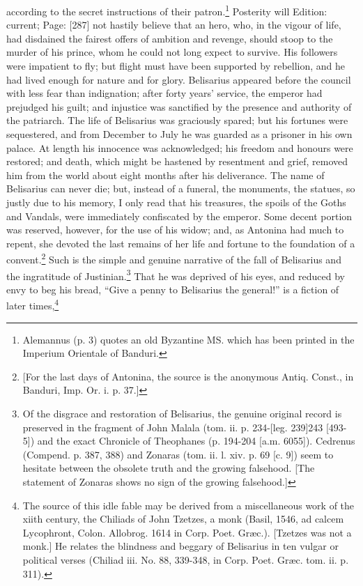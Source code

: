 according to the secret instructions of their patron.\footnote{Alemannus (p. 3) quotes an old Byzantine MS. which has been printed in the Imperium Orientale of Banduri.} Posterity will Edition: current; Page: [287] not hastily believe that an hero, who, in the vigour of life, had disdained the fairest offers of ambition and revenge, should stoop to the murder of his prince, whom he could not long expect to survive. His followers were impatient to fly; but flight must have been supported by rebellion, and he had lived enough for nature and for glory. Belisarius appeared before the council with less fear than indignation; after forty years\texthebrew{}’ service, the emperor had prejudged his guilt; and injustice was sanctified by the presence and authority of the patriarch. The life of Belisarius was graciously spared; but his fortunes were sequestered, and from December to July he was guarded as a prisoner in his own palace. At length his innocence was acknowledged; his freedom and honours were restored; and death, which might be hastened by resentment and grief, removed him from the world about eight months after his deliverance. The name of Belisarius can never die; but, instead of a funeral, the monuments, the statues, so justly due to his memory, I only read that his treasures, the spoils of the Goths and Vandals, were immediately confiscated by the emperor. Some decent portion was reserved, however, for the use of his widow; and, as Antonina had much to repent, she devoted the last remains of her life and fortune to the foundation of a convent.\footnote{[For the last days of Antonina, the source is the anonymous Antiq. Const., in Banduri, Imp. Or. i. p. 37.]} Such is the simple and genuine narrative of the fall of Belisarius and the ingratitude of Justinian.\footnote{Of the disgrace and restoration of Belisarius, the genuine original record is preserved in the fragment of John Malala (tom. ii. p. 234-[leg. 239]243 [493-5]) and the exact Chronicle of Theophanes (p. 194-204 [a.m. 6055]). Cedrenus (Compend. p. 387, 388) and Zonaras (tom. ii. l. xiv. p. 69 [c. 9]) seem to hesitate between the obsolete truth and the growing falsehood. [The statement of Zonaras shows no sign of the growing falsehood.]} That he was deprived of his eyes, and reduced by envy to beg his bread, \texthebrew{“}Give a penny to Belisarius the general!\texthebrew{}” is a fiction of later times,\footnote{The source of this idle fable may be derived from a miscellaneous work of the xiith century, the Chiliads of John Tzetzes, a monk (Basil, 1546, ad calcem Lycophront, Colon. Allobrog. 1614 in Corp. Poet. Græc.). [Tzetzes was not a monk.] He relates the blindness and beggary of Belisarius in ten vulgar or political verses (Chiliad iii. No. 88, 339-348, in Corp. Poet. Græc. tom. ii. p. 311).

}
